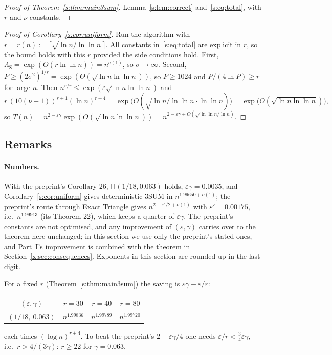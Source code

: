 \documentclass[11pt]{article}
\theoremstyle{definition}
\theoremstyle{remark}
\newcommand{\Hyp}{\mathsf{H}}
\begin{document}
\begin{proof}[Proof of Theorem~\ref{s:thm:main3sum}]
Lemma~\ref{s:lem:correct} and~\eqref{s:eq:total}, with $r$ and $\nu$ constants.
\end{proof}

\begin{proof}[Proof of Corollary~\ref{s:cor:uniform}]
Run the algorithm with $r=r(n):=\lceil\sqrt{\ln n/\ln\ln n}\,\rceil$. All constants in~\eqref{s:eq:total} are explicit in $r$, so the bound holds with this $r$ provided the side conditions hold. First, $\Lambda_{\mathrm S}=\exp(O(r\ln\ln n))=n^{o(1)}$, so $\sigma\to\infty$. Second, $P\ge(2\sigma^2)^{1/r}=\exp(\Theta(\sqrt{\ln n\ln\ln n}))$, so $P\ge1024$ and $P/(4\ln P)\ge r$ for large $n$. Then $n^{\varepsilon/r}\le\exp(\varepsilon\sqrt{\ln n\ln\ln n})$ and
\[
r\,(10(\nu+1))^{r+1}(\ln n)^{r+4}=\exp\big(O(\sqrt{\ln n/\ln\ln n}\cdot\ln\ln n)\big)=\exp\big(O(\sqrt{\ln n\ln\ln n})\big),
\]
so $T(n)=n^{2-\varepsilon\gamma}\exp(O(\sqrt{\ln n\ln\ln n}))=n^{2-\varepsilon\gamma+O(\sqrt{\ln\ln n/\ln n})}$.
\end{proof}

\subsection{Remarks}\label{s:sec:numbers}

\paragraph{Numbers.} With the preprint's Corollary 26, $\Hyp(1/18,0.063)$ holds, $\varepsilon\gamma=0.0035$, and Corollary~\ref{s:cor:uniform} gives deterministic 3SUM in $n^{1.99650+o(1)}$; the preprint's route through Exact Triangle gives $n^{2-\varepsilon'/2+o(1)}$ with $\varepsilon'=0.00175$, i.e.\ $n^{1.99913}$ (its Theorem 22), which keeps a quarter of $\varepsilon\gamma$. The preprint's constants are not optimised, and any improvement of $(\varepsilon,\gamma)$ carries over to the theorem here unchanged; in this section we use only the preprint's stated ones, and Part~\hyperref[m:partI]{I}'s improvement is combined with the theorem in Section~\ref{x:sec:consequences}. Exponents in this section are rounded up in the last digit.

For a fixed $r$ (Theorem~\ref{s:thm:main3sum}) the saving is $\varepsilon\gamma-\varepsilon/r$:
\begin{center}
\begin{tabular}{c|c|c|c}
$(\varepsilon,\gamma)$ & $r=30$ & $r=40$ & $r=80$\\\hline
$(1/18,\ 0.063)$ & $n^{1.99836}$ & $n^{1.99789}$ & $n^{1.99720}$
\end{tabular}
\end{center}
each times $(\log n)^{r+4}$. To beat the preprint's $2-\varepsilon\gamma/4$ one needs $\varepsilon/r<\frac34\varepsilon\gamma$, i.e.\ $r>4/(3\gamma)$: $r\ge22$ for $\gamma=0.063$.
\end{document}
